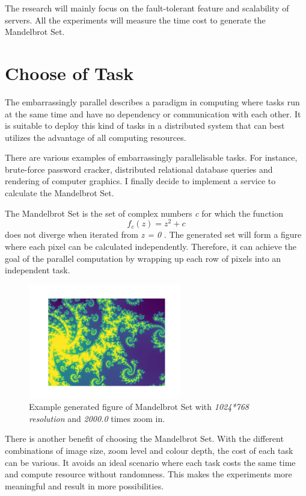 \documentclass[runningheads,a4paper]{llncs}
\begin{document}
The research will mainly focus on the fault-tolerant feature and scalability of servers. All the experiments will measure the time cost to generate the Mandelbrot Set. 

\section{Choose of Task}
The embarrassingly parallel describes a paradigm in computing where tasks run at the same time and have no dependency or communication with each other\cite{parallel}. It is suitable to deploy this kind of tasks in a distributed system that can best utilizes the advantage of all computing resources.

There are various examples of embarrassingly parallelisable tasks. For instance, brute-force password cracker, distributed relational database queries and rendering of computer graphics. I finally decide to implement a service to calculate the Mandelbrot Set. 

The Mandelbrot Set is the set of complex numbers \emph{c} for which the function
\begin{equation}
f_{c}(z)=z^{2}+c
\end{equation}
does not diverge when iterated from \emph{z = 0} \cite{Mandelbrot}. The generated set will form a figure where each pixel can be calculated independently. Therefore, it can achieve the goal of the parallel computation by wrapping up each row of pixels into an independent task.

\begin{figure}[htbp]
\begin{center}
\includegraphics[height=5cm]{./result_zoom_2000.0.png}
\caption{Example generated figure of Mandelbrot Set with \emph{1024*768 resolution} and \emph{2000.0} times zoom in.}
\label{Mandelbrot Set Figure}
\end{center}
\end{figure}

There is another benefit of choosing the Mandelbrot Set. With the different combinations of image size, zoom level and colour depth, the cost of each task can be various. It avoids an ideal scenario where each task costs the same time and compute resource without randomness. This makes the experiments more meaningful and result in more possibilities.
\end{document}
